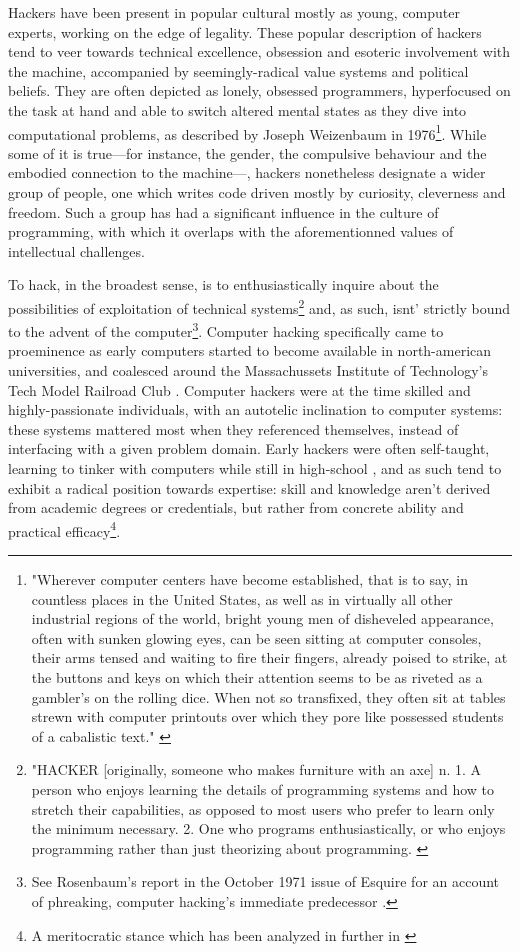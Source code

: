 Hackers have been present in popular cultural mostly as young, computer experts, working on the edge of legality. These popular description of hackers tend to veer towards technical excellence, obsession and esoteric involvement with the machine, accompanied by seemingly-radical value systems and political beliefs. They are often depicted as lonely, obsessed programmers, hyperfocused on the task at hand and able to switch altered mental states as they dive into computational problems, as described by Joseph Weizenbaum in 1976\footnote{"Wherever computer centers have become established, that is to say, in countless places in the United States, as well as in virtually all other industrial regions of the world, bright young men of disheveled appearance, often with sunken glowing eyes, can be seen sitting at computer consoles, their arms tensed and waiting to fire their fingers, already poised to strike, at the buttons and keys on which their attention seems to be as riveted as a gambler's on the rolling dice. When not so transfixed, they often sit at tables strewn with computer printouts over which they pore like possessed students of a cabalistic text." \citep{weizenbaum_computer_1976}}. While some of it is true—for instance, the gender, the compulsive behaviour and the embodied connection to the machine—, hackers nonetheless designate a wider group of people, one which writes code driven mostly by curiosity, cleverness and freedom. Such a group has had a significant influence in the culture of programming, with which it overlaps with the aforementionned values of intellectual challenges.

To hack, in the broadest sense, is to enthusiastically inquire about the possibilities of exploitation of technical systems\footnote{"HACKER [originally, someone who makes furniture with an axe] n. 1. A person who enjoys learning the details of programming systems and how to stretch their capabilities, as opposed to most users who prefer to learn only the minimum necessary. 2. One who programs enthusiastically, or who enjoys programming rather than just theorizing about programming. \citep{dourish_original_1988}} and, as such, isnt' strictly bound to the advent of the computer\footnote{See Rosenbaum's report in the October 1971 issue of Esquire for an account of phreaking, computer hacking's immediate predecessor \citep{rosenbaum_secrets_2004}.}. Computer hacking specifically came to proeminence as early computers started to become available in north-american universities, and coalesced around the Massachussets Institute of Technology's Tech Model Railroad Club \citep{levy_hackers_2010}. Computer hackers were at the time skilled and highly-passionate individuals, with an autotelic inclination to computer systems: these systems mattered most when they referenced themselves, instead of interfacing with a given problem domain. Early hackers were often self-taught, learning to tinker with computers while still in high-school \citep{lammers_programmers_1986}, and as such tend to exhibit a radical position towards expertise: skill and knowledge aren't derived from academic degrees or credentials, but rather from concrete ability and practical efficacy\footnote{A meritocratic stance which has been analyzed in further in  \citep{coleman_aesthetics_2018}}.

